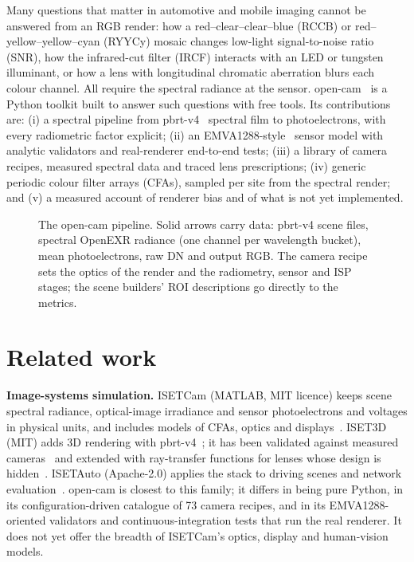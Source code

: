 \documentclass[letterpaper,twocolumn,fleqn]{article}
\begin{document}
Many questions that matter in automotive and mobile imaging cannot be answered from an RGB render: how a red--clear--clear--blue (RCCB) or red--yellow--yellow--cyan (RYYCy) mosaic changes low-light signal-to-noise ratio (SNR), how the infrared-cut filter (IRCF) interacts with an LED or tungsten illuminant, or how a lens with longitudinal chromatic aberration blurs each colour channel. All require the spectral radiance at the sensor. open-cam~\cite{opencam} is a Python toolkit built to answer such questions with free tools. Its contributions are: (i) a spectral pipeline from pbrt-v4~\cite{pharr2023pbrt,pbrtv4code} spectral film to photoelectrons, with every radiometric factor explicit; (ii) an EMVA1288-style~\cite{emva1288std} sensor model with analytic validators and real-renderer end-to-end tests; (iii) a library of camera recipes, measured spectral data and traced lens prescriptions; (iv) generic periodic colour filter arrays (CFAs), sampled per site from the spectral render; and (v) a measured account of renderer bias and of what is not yet implemented.

\begin{figure}[t]
\centering
\resizebox{\textwidth}{!}{}
\caption{The open-cam pipeline. Solid arrows carry data: pbrt-v4 scene files, spectral OpenEXR radiance (one channel per wavelength bucket), mean photoelectrons, raw DN and output RGB. The camera recipe sets the optics of the render and the radiometry, sensor and ISP stages; the scene builders' ROI descriptions go directly to the metrics.}
\label{fig:pipeline}
\end{figure}

\section{Related work}
\textbf{Image-systems simulation.} ISETCam (MATLAB, MIT licence) keeps scene spectral radiance, optical-image irradiance and sensor photoelectrons and voltages in physical units, and includes models of CFAs, optics and displays~\cite{isetcam,farrell2012digital}. ISET3D (MIT) adds 3D rendering with pbrt-v4~\cite{iset3d}; it has been validated against measured cameras~\cite{lyu2021cornell,lyu2022validation} and extended with ray-transfer functions for lenses whose design is hidden~\cite{goossens2022ray}. ISETAuto (Apache-2.0) applies the stack to driving scenes and network evaluation~\cite{isetauto,blasinski2018optimizing,liu2019soft}. open-cam is closest to this family; it differs in being pure Python, in its configuration-driven catalogue of 73 camera recipes, and in its EMVA1288-oriented validators and continuous-integration tests that run the real renderer. It does not yet offer the breadth of ISETCam's optics, display and human-vision models.
\end{document}
